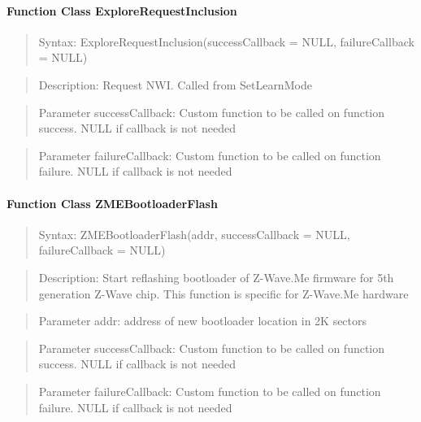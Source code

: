 \paragraph{Function Class ExploreRequestInclusion}
\begin{quote}Syntax: ExploreRequestInclusion(successCallback = NULL, failureCallback = NULL)\end{quote}
\begin{quote}Description: Request NWI. Called from SetLearnMode\end{quote}
\begin{quote}Parameter successCallback: Custom function to be called on function success. NULL if callback is not needed\end{quote}
\begin{quote}Parameter failureCallback: Custom function to be called on function failure. NULL if callback is not needed\end{quote}


\paragraph{Function Class ZMEBootloaderFlash}
\begin{quote}Syntax: ZMEBootloaderFlash(addr, successCallback = NULL, failureCallback = NULL)\end{quote}
\begin{quote}Description: Start reflashing bootloader of Z-Wave.Me firmware for 5th generation Z-Wave chip. This function is specific for Z-Wave.Me hardware\end{quote}
\begin{quote}Parameter addr: address of new bootloader location in 2K sectors\end{quote}
\begin{quote}Parameter successCallback: Custom function to be called on function success. NULL if callback is not needed\end{quote}
\begin{quote}Parameter failureCallback: Custom function to be called on function failure. NULL if callback is not needed\end{quote}


